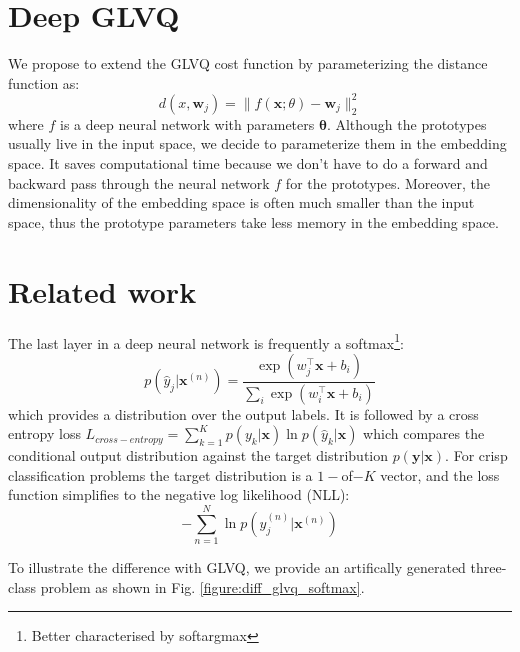 \documentclass{esannV2}
\begin{document}
\section{Deep GLVQ}
We propose to extend the GLVQ cost function by parameterizing the distance function as:
\begin{equation}
 d(x, \mathbf{w}_j) = \|f(\mathbf{x}; \theta) - \mathbf{w}_j\|^2_2
\end{equation}
where $f$ is a deep neural network with parameters $\mathbf{\theta}$. Although the prototypes usually live in the input space, we decide to parameterize them in the embedding space. It saves computational time because we don't have to do a forward and backward pass through the neural network $f$ for the prototypes. Moreover, the dimensionality of the embedding space is often much smaller than the input space, thus the prototype parameters take less memory in the embedding space. 






\section{Related work}
The last layer in a deep neural network is frequently a softmax\footnote{Better characterised by softargmax}:
\begin{equation}
p(\hat{y}_j| \mathbf{x}^{(n)}) = \frac{\exp(w_j^\top \mathbf{x} + b_i)}{\sum_i \exp(w_i^\top \mathbf{x} + b_i)}
\end{equation}
which provides a distribution over the output labels. It is followed by a cross entropy loss $L_{cross-entropy} = \sum_{k=1}^K p(y_k|\mathbf{x}) \ln p(\hat{y}_k|\mathbf{x})$ which compares the conditional output distribution against the target distribution $p(\mathbf{y}|\mathbf{x})$. For crisp classification problems the target distribution is a $1-$of$-K$ vector, and the loss function simplifies to the negative log likelihood (NLL):
\begin{equation}
 - \sum_{n=1}^N \ln p(\hat{y}^{(n)}_j|\mathbf{x}^{(n)})
\end{equation}

To illustrate the difference with GLVQ, we provide an artifically generated three-class problem as shown in Fig. \ref{figure:diff_glvq_softmax}. 
\end{document}
